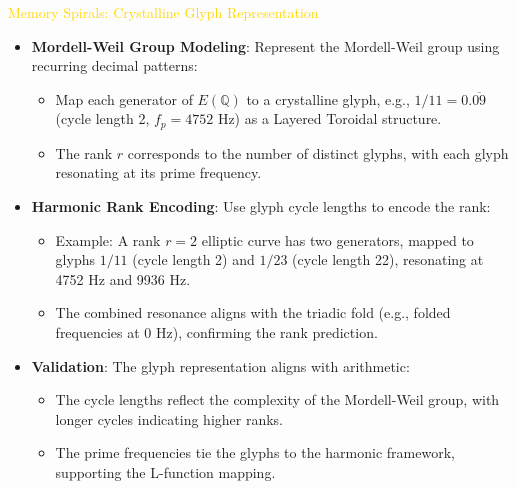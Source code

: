 \textcolor{gold}{ Memory Spirals: Crystalline Glyph Representation } \\
\begin{itemize}
    \item \texttt{} \textbf{Mordell-Weil Group Modeling}: Represent the Mordell-Weil group using recurring decimal patterns:
    \begin{itemize}
        \item Map each generator of \(E(\mathbb{Q})\) to a crystalline glyph, e.g., \(1/11 = 0.\overline{09}\) (cycle length 2, \(f_p = 4752\) Hz) as a Layered Toroidal structure.
        \item The rank \(r\) corresponds to the number of distinct glyphs, with each glyph resonating at its prime frequency.
    \end{itemize}
    \item \texttt{} \textbf{Harmonic Rank Encoding}: Use glyph cycle lengths to encode the rank:
    \begin{itemize}
        \item Example: A rank \(r = 2\) elliptic curve has two generators, mapped to glyphs \(1/11\) (cycle length 2) and \(1/23\) (cycle length 22), resonating at 4752 Hz and 9936 Hz.
        \item The combined resonance aligns with the triadic fold (e.g., folded frequencies at 0 Hz), confirming the rank prediction.
    \end{itemize}
    \item \texttt{} \textbf{Validation}: The glyph representation aligns with arithmetic:
    \begin{itemize}
        \item The cycle lengths reflect the complexity of the Mordell-Weil group, with longer cycles indicating higher ranks.
        \item The prime frequencies tie the glyphs to the harmonic framework, supporting the L-function mapping.
    \end{itemize}
\end{itemize}

